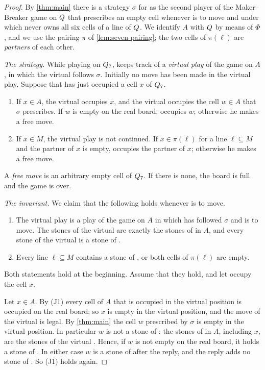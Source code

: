 \begin{proof}
By \cref{thm:main} there is a strategy $\sigma$ for \Breaker{} as the second player of the Maker--Breaker
game on $Q$ that prescribes an empty cell whenever \Breaker{} is to move and under which \Maker{} never
owns all six cells of a line of $Q$. We identify $A$ with $Q$ by means of $\Phi$, and we use the
pairing $\pi$ of \cref{lem:seven-pairing}; the two cells of $\pi(\ell)$ are \emph{partners} of each
other.

\smallskip\noindent\emph{The strategy.} While playing on $Q_7$, \Breaker{} keeps track of a
\emph{virtual play} of the game on $A$, in which the virtual \Breaker{} follows $\sigma$. Initially no
move has been made in the virtual play. Suppose that \Maker{} has just occupied a cell $x$ of $Q_7$.
\begin{enumerate}[label=\textup{(\roman*)}]
\item If $x\in A$, the virtual \Maker{} occupies $x$, and the virtual \Breaker{} occupies the cell $w\in A$
      that $\sigma$ prescribes. If $w$ is empty on the real board, \Breaker{} occupies $w$; otherwise he
      makes a free move.
\item If $x\in M$, the virtual play is not continued. If $x\in\pi(\ell)$ for a line $\ell\subseteq M$ and
      the partner of $x$ is empty, \Breaker{} occupies the partner of $x$; otherwise he makes a free move.
\end{enumerate}
A \emph{free move} is an arbitrary empty cell of $Q_7$. If there is none, the board is full and the
game is over.

\smallskip\noindent\emph{The invariant.} We claim that the following holds whenever \Maker{} is to move.
\begin{enumerate}[label=\textup{(J\arabic*)}]
\item The virtual play is a play of the game on $A$ in which \Breaker{} has followed $\sigma$ and
      \Maker{} is to move. The stones of the virtual \Maker{} are exactly the stones of \Maker{} in $A$,
      and every stone of the virtual \Breaker{} is a stone of \Breaker.
\item Every line $\ell\subseteq M$ contains a stone of \Breaker, or both cells of $\pi(\ell)$ are empty.
\end{enumerate}
Both statements hold at the beginning. Assume that they hold, and let \Maker{} occupy the cell $x$.

Let $x\in A$. By (J1) every cell of $A$ that is occupied in the virtual position is occupied on the
real board; so $x$ is empty in the virtual position, and the move of the virtual \Maker{} is legal. By
\cref{thm:main} the cell $w$ prescribed by $\sigma$ is empty in the virtual position. In particular $w$
is not a stone of \Maker: the stones of \Maker{} in $A$, including $x$, are the stones of the virtual
\Maker. Hence, if $w$ is not empty on the real board, it holds a stone of \Breaker. In either case $w$ is
a stone of \Breaker{} after the reply, and the reply adds no stone of \Maker. So (J1) holds again.


\end{proof}
